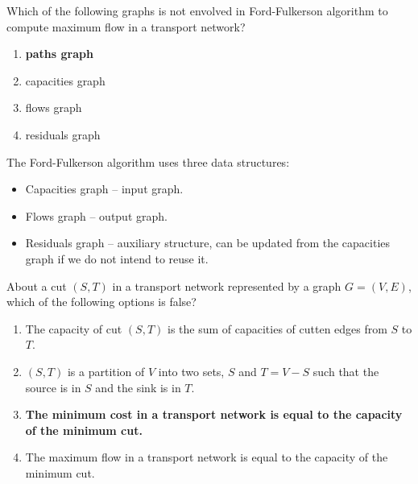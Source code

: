 {\begin{center}
\end{center}

Which of the following graphs is not envolved in Ford-Fulkerson algorithm to compute maximum flow in a transport network?
\begin{enumerate}[label=\Alph*)]\itemsep0em
    \item \textbf{paths graph \greencheckmark}
    \item capacities graph
    \item flows graph
    \item residuals graph
\end{enumerate}

\ansseparator

The Ford-Fulkerson algorithm uses three data structures:
\begin{itemize}
    \item Capacities graph -- input graph.
    \item Flows graph -- output graph.
    \item Residuals graph -- auxiliary structure, can be updated from the capacities graph if we do not intend to reuse it.
\end{itemize}

About a cut $(S, T)$ in a transport network represented by a graph $G=(V,E)$, which of the following options is false?
\begin{enumerate}[label=\Alph*)]\itemsep0em
    \item \label{itm:2019N-P1-14-A} The capacity of cut $(S,T)$ is the sum of capacities of cutten edges from $S$ to $T$.
    \item \label{itm:2019N-P1-14-B} $(S,T)$ is a partition of $V$ into two sets, $S$ and $T=V-S$ such that the source is in $S$ and the sink is in $T$.
    \item \label{itm:2019N-P1-14-C} \label{itm:2019N-P1-14-correct} \textbf{The minimum cost in a transport network is equal to the capacity of the minimum cut. \greencheckmark}
    \item \label{itm:2019N-P1-14-D} The maximum flow in a transport network is equal to the capacity of the minimum cut.
\end{enumerate}

}
